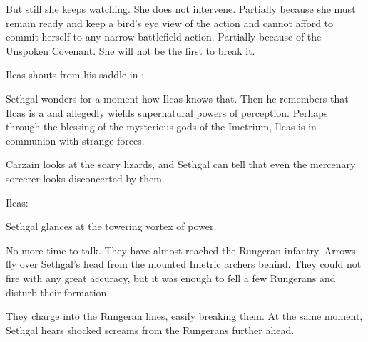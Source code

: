 But still she keeps watching.
She does not intervene. 
Partially because she must remain ready and keep a bird's eye view of the action and cannot afford to commit herself to any narrow battlefield action.
Partially because of the Unspoken Covenant.
She will not be the first to break it. 





\begin{comment}
  \subsection{Imetrians fight}
\end{comment}
\new
Ilcas shouts from his saddle in \Tepharin: 

Sethgal wonders for a moment how Ilcas knows that.
Then he remembers that Ilcas is a \nycaneer and allegedly wields supernatural powers of perception.
Perhaps through the blessing of the mysterious gods of the Imetrium, Ilcas is in communion with strange forces. 




Carzain looks at the scary lizards, and Sethgal can tell that even the mercenary sorcerer looks disconcerted by them.

Ilcas:

Sethgal glances at the towering vortex of power. 


No more time to talk.
They have almost reached the Rungeran infantry. 
Arrows fly over Sethgal's head from the mounted Imetric archers behind. 
They could not fire with any great accuracy, but it was enough to fell a few Rungerans and disturb their formation. 

They charge into the Rungeran lines, easily breaking them. 
At the same moment, Sethgal hears shocked screams from the Rungerans further ahead. 

